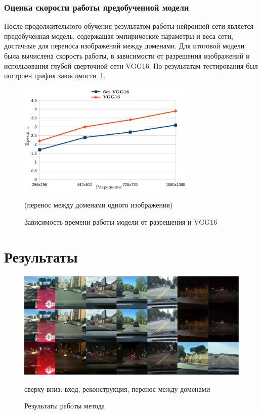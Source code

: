 \documentclass[11pt,a4paper]{extarticle}
\begin{document}
{		\subsubsection*{Оценка скорости работы предобученной модели}\label{sec:eval:speed}

			После продолжительного обучения результатом работы нейронной сети является предобученная модель, содержащая эмпирические параметры и веса сети, достачные для переноса изображений между доменами.
			Для итоговой модели была вычислена скорость работы, в зависимости от разрешения изображений и использования глубой сверточной сети VGG16.
			По результатам тестирования был построен график зависимости~\ref{pic:speedtest}.

			\begin{figure}[ht]
				\centering
				\includegraphics[width=0.75\textwidth]{img/speedtest}
				\caption{Зависимость времени работы модели от разрешения и VGG16}{
					(перенос между доменами одного изображения)
				}
				\label{pic:speedtest}
			\end{figure}
			
	\newpage
	\section{Результаты}\label{sec:results}

		\begin{figure}[ht]
			\centering
			\includegraphics[width=\textwidth]{img/results}
			\caption{Результаты работы метода}{
				\small{
					сверху-вниз: вход, реконструкция, перенос между доменами
				}
			}
			\label{pic:results}
		\end{figure}

}
\end{document}
